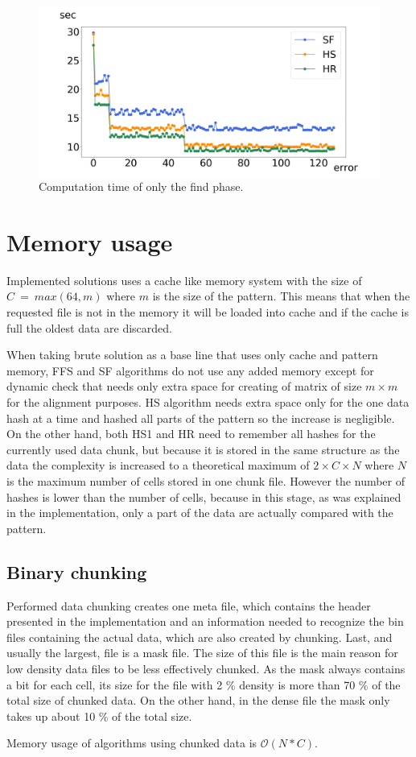 \begin{figure}[h]
\centering
\includegraphics[width=\textwidth]{img/errorFind}
\caption{Computation time of only the find phase.}
\label{fig_errF}
\end{figure}

\section{Memory usage} \label{memoryuse}
Implemented solutions uses a cache like memory system with the size of $C~=~max(64, m)$ where $m$ is the size of the pattern. This means that when the requested file is not in the memory it will be loaded into cache and if the cache is full the oldest data are discarded. 

When taking brute solution as a base line that uses only cache and pattern memory, FFS and SF algorithms do not use any added memory except for dynamic check that needs only extra space for creating of matrix of size $m\times m$ for the alignment purposes. HS algorithm needs extra space only for the one data hash at a time and hashed all parts of the pattern so the increase is negligible. On the other hand, both HS1 and HR need to remember all hashes for the currently used data chunk, but because it is stored in the same structure as the data the complexity is increased to a theoretical maximum of $2\times C \times N$ where $N$ is the maximum number of cells stored in one chunk file. However the number of hashes is lower than the number of cells, because in this stage, as was explained in the implementation, only a part of the data are actually compared with the pattern.

\subsection{Binary chunking}
Performed data chunking creates one meta file, which contains the header presented in the implementation and an information needed to recognize the bin files containing the actual data, which are also created by chunking. Last, and usually the largest, file is a mask file. The size of this file is the main reason for low density data files to be less effectively chunked. As the mask always contains a bit for each cell, its size for the file with 2 \% density is more than 70 \% of the total size of chunked data. On the other hand, in the dense file the mask only takes up about 10 \% of the total size. 

Memory usage of algorithms using chunked data is $\mathcal{O}(N*C)$.